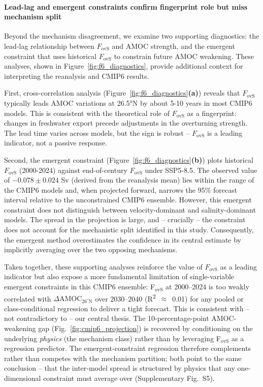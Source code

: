 \documentclass[11pt,a4paper]{article}
\begin{document}
\paragraph*{Lead-lag and emergent constraints confirm fingerprint role but miss mechanism split}

Beyond the mechanism disagreement, we examine two supporting diagnostics: the lead-lag relationship between \(F_{\mathrm{ovS}}\) and AMOC strength, and the emergent constraint that uses historical \(F_{\mathrm{ovS}}\) to constrain future AMOC weakening. These analyses, shown in Figure~\ref{fig:f6_diagnostics}, provide additional context for interpreting the reanalysis and CMIP6 results.

First, cross-correlation analysis (Figure~\ref{fig:f6_diagnostics}\textbf{(a)}) reveals that \(F_{\mathrm{ovS}}\) typically leads AMOC variations at 26.5°N by about 5-10 years in most CMIP6 models. This is consistent with the theoretical role of \(F_{\mathrm{ovS}}\) as a fingerprint: changes in freshwater export precede adjustments in the overturning strength. The lead time varies across models, but the sign is robust -- \(F_{\mathrm{ovS}}\) is a leading indicator, not a passive response.

Second, the emergent constraint (Figure~\ref{fig:f6_diagnostics}\textbf{(b)}) plots historical \(F_{\mathrm{ovS}}\) (2000-2024) against end-of-century \(F_{\mathrm{ovS}}\) under SSP5-8.5. The observed value of \(-0.078 \pm 0.024\) Sv (derived from the reanalysis mean) lies within the range of the CMIP6 models and, when projected forward, narrows the 95\% forecast interval relative to the unconstrained CMIP6 ensemble. However, this emergent constraint does not distinguish between velocity-dominant and salinity-dominant models. The spread in the projection is large, and -- crucially -- the constraint does not account for the mechanistic split identified in this study. Consequently, the emergent method overestimates the confidence in its central estimate by implicitly averaging over the two opposing mechanisms.

Taken together, these supporting analyses reinforce the value of \(F_{\mathrm{ovS}}\) as a leading indicator but also expose a more fundamental limitation of single-variable emergent constraints in this CMIP6 ensemble: F$_{\mathrm{ovS}}$ at 2000--2024 is too weakly correlated with $\Delta\mathrm{AMOC}_{26^\circ\mathrm{N}}$ over 2030--2040 (R\textsuperscript{2}~$\approx$~0.01) for any pooled or class-conditional regression to deliver a tight forecast. This is consistent with -- not contradictory to -- our central thesis. The 10-percentage-point AMOC-weakening gap (Fig.~\ref{fig:cmip6_projection}) is recovered by conditioning on the underlying \emph{physics} (the mechanism class) rather than by leveraging F$_{\mathrm{ovS}}$ as a regression predictor. The emergent-constraint regression therefore complements rather than competes with the mechanism partition; both point to the same conclusion -- that the inter-model spread is structured by physics that any one-dimensional constraint must average over (Supplementary Fig.~S5).
\end{document}
